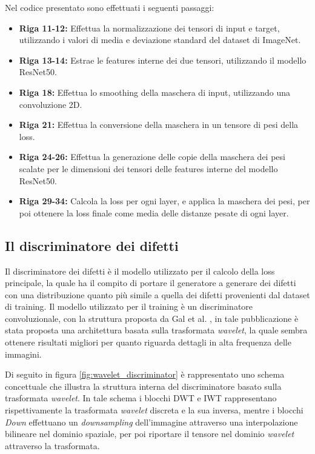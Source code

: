 Nel codice presentato sono effettuati i seguenti passaggi:
\begin{itemize}
    \item \textbf{Riga 11-12:} Effettua la normalizzazione dei tensori di input e target, utilizzando i valori di media e deviazione standard del dataset di ImageNet.
    \item \textbf{Riga 13-14:} Estrae le features interne dei due tensori, utilizzando il modello ResNet50.
    \item \textbf{Riga 18:} Effettua lo smoothing della maschera di input, utilizzando una convoluzione 2D.
    \item \textbf{Riga 21:} Effettua la conversione della maschera in un tensore di pesi della loss.
    \item \textbf{Riga 24-26:} Effettua la generazione delle copie della maschera dei pesi scalate per le dimensioni dei tensori delle features interne
        del modello ResNet50.
    \item \textbf{Riga 29-34:} Calcola la loss per ogni layer, e applica la maschera dei pesi, 
        per poi ottenere la loss finale come media delle distanze pesate di ogni layer.
\end{itemize}

\subsection{Il discriminatore dei difetti}
Il discriminatore dei difetti è il modello utilizzato per il calcolo della loss principale, la quale ha il compito di 
portare il generatore a generare dei difetti con una distribuzione quanto più simile a quella dei difetti provenienti dal dataset di training.
Il modello utilizzato per il training è un discriminatore convoluzionale, con la struttura proposta da Gal et al. \cite{gal2021swagan},
in tale pubblicazione è stata proposta una architettura basata sulla trasformata \textit{wavelet}, la quale sembra ottenere risultati
migliori per quanto riguarda dettagli in alta frequenza delle immagini.

Di seguito in figura \ref{fig:wavelet_discriminator} è rappresentato uno schema concettuale che illustra la struttura interna 
del discriminatore basato sulla trasformata \textit{wavelet}. In tale schema i blocchi DWT e IWT rappresentano rispettivamente
la trasformata \textit{wavelet} discreta e la sua inversa, mentre i blocchi \textit{Down} effettuano un \textit{downsampling} dell'immagine
attraverso una interpolazione bilineare nel dominio spaziale, per poi riportare il tensore nel dominio \textit{wavelet} attraverso la trasformata.

